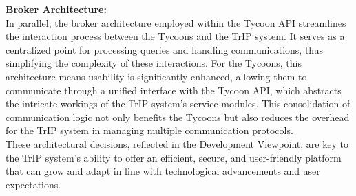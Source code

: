 \noindent \textbf{Broker Architecture:} \\
In parallel, the broker architecture employed within the Tycoon API streamlines the interaction process between the Tycoons and the TrIP system. It serves as a centralized point for processing queries and handling communications, thus simplifying the complexity of these interactions. For the Tycoons, this architecture means usability is significantly enhanced, allowing them to communicate through a unified interface with the Tycoon API, which abstracts the intricate workings of the TrIP system's service modules. This consolidation of communication logic not only benefits the Tycoons but also reduces the overhead for the TrIP system in managing multiple communication protocols. \\

These architectural decisions, reflected in the Development Viewpoint, are key to the TrIP system's ability to offer an efficient, secure, and user-friendly platform that can grow and adapt in line with technological advancements and user expectations.
